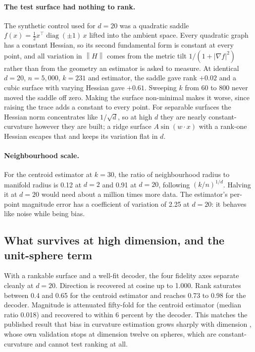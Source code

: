 \documentclass[11pt,a4paper]{article}
\newcommand{\norm}[1]{\left\lVert #1 \right\rVert}
\begin{document}
\paragraph{The test surface had nothing to rank.} The synthetic control used for $d = 20$ was a quadratic saddle $f(x) = \tfrac12 x^{\top}\operatorname{diag}(\pm 1)\, x$ lifted into the ambient space. Every quadratic graph has a constant Hessian, so its second fundamental form is constant at every point, and all variation in $\norm{H}$ comes from the metric tilt $1/(1 + \lvert \nabla f \rvert^2)$ rather than from the geometry an estimator is asked to measure. At identical $d = 20$, $n = 5{,}000$, $k = 231$ and estimator, the saddle gave rank $+0.02$ and a cubic surface with varying Hessian gave $+0.61$. Sweeping $k$ from 60 to 800 never moved the saddle off zero. Making the surface non-minimal makes it worse, since raising the trace adds a constant to every point. For separable surfaces the Hessian norm concentrates like $1/\sqrt{d}$, so at high $d$ they are nearly constant-curvature however they are built; a ridge surface $A\sin(w\cdot x)$ with a rank-one Hessian escapes that and keeps its variation flat in $d$.

\paragraph{Neighbourhood scale.} For the centroid estimator at $k = 30$, the ratio of neighbourhood radius to manifold radius is 0.12 at $d = 2$ and 0.91 at $d = 20$, following $(k/n)^{1/d}$. Halving it at $d = 20$ would need about a million times more data. The estimator's per-point magnitude error has a coefficient of variation of 2.25 at $d = 20$: it behaves like noise while being bias.

\subsection{What survives at high dimension, and the unit-sphere term}
\label{sec:survives}

With a rankable surface and a well-fit decoder, the four fidelity axes separate cleanly at $d = 20$. Direction is recovered at cosine up to 1.000. Rank saturates between 0.4 and 0.65 for the centroid estimator and reaches 0.73 to 0.98 for the decoder. Magnitude is attenuated fifty-fold for the centroid estimator (median ratio 0.018) and recovered to within 6 percent by the decoder. This matches the published result that bias in curvature estimation grows sharply with dimension \citep{chen2025curvature}, whose own validation stops at dimension twelve on spheres, which are constant-curvature and cannot test ranking at all.
\end{document}

